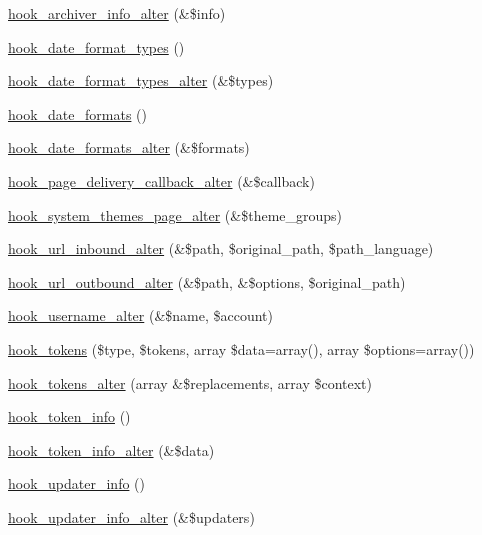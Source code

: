 \begin{DoxyCompactItemize}
\item 
\hyperlink{group__hooks_ga4e6f6f94acbd7a21c4a4a2cc6916356d}{hook\_\-archiver\_\-info\_\-alter} (\&\$info)
\item 
\hyperlink{group__hooks_gaadde7af71d0b4f827cf7aac1c88c4d23}{hook\_\-date\_\-format\_\-types} ()
\item 
\hyperlink{group__hooks_ga22573783fb241b759f4e3e2c211d13bf}{hook\_\-date\_\-format\_\-types\_\-alter} (\&\$types)
\item 
\hyperlink{group__hooks_ga2a190ba304193ab7752bfc489463a0d7}{hook\_\-date\_\-formats} ()
\item 
\hyperlink{group__hooks_ga0adddc1a49ca34ded3f081894de9d4f7}{hook\_\-date\_\-formats\_\-alter} (\&\$formats)
\item 
\hyperlink{group__hooks_gaee6a1d02d5046d47069a8e385385ef15}{hook\_\-page\_\-delivery\_\-callback\_\-alter} (\&\$callback)
\item 
\hyperlink{group__hooks_ga710e94821a231299d36b2405008121d9}{hook\_\-system\_\-themes\_\-page\_\-alter} (\&\$theme\_\-groups)
\item 
\hyperlink{group__hooks_ga32da9c3f1486c293818f30fa4037e33f}{hook\_\-url\_\-inbound\_\-alter} (\&\$path, \$original\_\-path, \$path\_\-language)
\item 
\hyperlink{group__hooks_gaae456dc4459a029bc099079814ded61f}{hook\_\-url\_\-outbound\_\-alter} (\&\$path, \&\$options, \$original\_\-path)
\item 
\hyperlink{group__hooks_ga877faf93c9acc42bb54cbd01cd8d9453}{hook\_\-username\_\-alter} (\&\$name, \$account)
\item 
\hyperlink{group__hooks_ga3bfd87d9a19b2397b0f970e1cff7ea4f}{hook\_\-tokens} (\$type, \$tokens, array \$data=array(), array \$options=array())
\item 
\hyperlink{group__hooks_gaeeea438e74b29e5603f0ed3f1967a257}{hook\_\-tokens\_\-alter} (array \&\$replacements, array \$context)
\item 
\hyperlink{group__hooks_gab868597197cf36911f95dcd29ae0b954}{hook\_\-token\_\-info} ()
\item 
\hyperlink{group__hooks_ga87392434688c9f52c4066de4ab9d73a8}{hook\_\-token\_\-info\_\-alter} (\&\$data)
\item 
\hyperlink{group__hooks_gafb9b375716a0ad02d35250dc252b3c99}{hook\_\-updater\_\-info} ()
\item 
\hyperlink{group__hooks_gaf697fc432c34c994712849afa70c1b89}{hook\_\-updater\_\-info\_\-alter} (\&\$updaters)
\item 

\end{DoxyCompactItemize}
